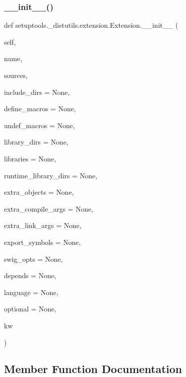 \subsubsection{\texorpdfstring{\+\_\+\+\_\+init\+\_\+\+\_\+()}{\_\_init\_\_()}}
{\footnotesize\ttfamily def setuptools.\+\_\+distutils.\+extension.\+Extension.\+\_\+\+\_\+init\+\_\+\+\_\+ (\begin{DoxyParamCaption}\item[{}]{self,  }\item[{}]{name,  }\item[{}]{sources,  }\item[{}]{include\+\_\+dirs = {\ttfamily None},  }\item[{}]{define\+\_\+macros = {\ttfamily None},  }\item[{}]{undef\+\_\+macros = {\ttfamily None},  }\item[{}]{library\+\_\+dirs = {\ttfamily None},  }\item[{}]{libraries = {\ttfamily None},  }\item[{}]{runtime\+\_\+library\+\_\+dirs = {\ttfamily None},  }\item[{}]{extra\+\_\+objects = {\ttfamily None},  }\item[{}]{extra\+\_\+compile\+\_\+args = {\ttfamily None},  }\item[{}]{extra\+\_\+link\+\_\+args = {\ttfamily None},  }\item[{}]{export\+\_\+symbols = {\ttfamily None},  }\item[{}]{swig\+\_\+opts = {\ttfamily None},  }\item[{}]{depends = {\ttfamily None},  }\item[{}]{language = {\ttfamily None},  }\item[{}]{optional = {\ttfamily None},  }\item[{}]{kw }\end{DoxyParamCaption})}



\subsection{Member Function Documentation}
\mbox{\label{classsetuptools_1_1__distutils_1_1extension_1_1Extension_ac5d5b70c3a158684630bbad94ac21da0}} 
